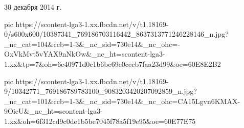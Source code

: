 30 декабря 2014 г.

\ifcmt
  pic https://scontent-lga3-1.xx.fbcdn.net/v/t1.18169-0/s600x600/10387341_769186703116442_8637313771246228146_n.jpg?_nc_cat=104&ccb=1-3&_nc_sid=730e14&_nc_ohc=-OxVkMvt5vYAX9nNkOw&_nc_ht=scontent-lga3-1.xx&tp=7&oh=6e40971d0c1b6be69e0cecb7faa23d99&oe=60E8E2B2
\fi

\ifcmt
  pic https://scontent-lga3-1.xx.fbcdn.net/v/t1.18169-9/10342771_769186789783100_9083203420207092859_n.jpg?_nc_cat=101&ccb=1-3&_nc_sid=730e14&_nc_ohc=CA15Lgvn6KMAX-9OicU&_nc_ht=scontent-lga3-1.xx&oh=6f312cd9c0de1b5be7045f78a5f19e95&oe=60E77E75
\fi


